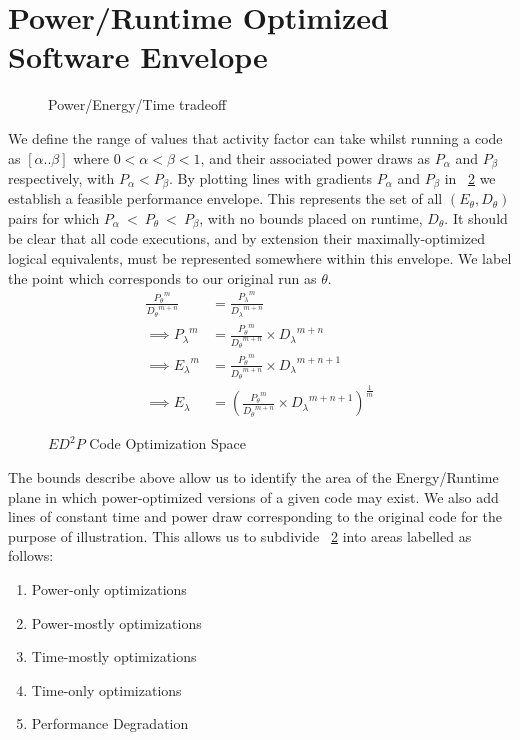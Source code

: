 
\section{Power/Runtime Optimized Software Envelope}

\begin{figure}
\centering

\caption{Power/Energy/Time tradeoff}
\label{fig:motivation}
\end{figure}


We define the range of values that activity factor can take whilst running a code as $[\alpha  .. \beta]$ where $0 < \alpha < \beta < 1$, and their associated power draws as $P_{\alpha}$ and $P_{\beta}$ respectively, with $P_{\alpha} < P_{\beta}$. By plotting lines with gradients $P_{\alpha}$ and $P_{\beta}$ in \figurename~\ref{fig:modeldraw} we establish a feasible performance envelope. This represents the set of all $(E_\theta, D_\theta)$ pairs for which $P_{\alpha}~<~P_\theta~<~P_{\beta}$, with no bounds placed on runtime, $D_\theta$. It should be clear that all code executions, and by extension their maximally-optimized logical equivalents, must be represented somewhere within this envelope. We label the point which corresponds to our original run as $\theta$.
\begin{align}
\frac{{P_{\theta}}^m}{{D_{\theta}}^{m+n}} &= \frac{{P_{\lambda}}^m}{{D_{\lambda}}^{m+n}} \nonumber \\
\implies {P_{\lambda}}^m &= \frac{{P_{\theta}}^m}{{D_{\theta}}^{m+n}} \times {D_\lambda}^{m+n} \nonumber \\ 
\implies {E_{\lambda}}^m &= \frac{{P_{\theta}}^m}{{D_{\theta}}^{m+n}} \times {D_\lambda}^{m+n+1} \nonumber \\ 
\implies E_{\lambda} &= (\frac{{P_{\theta}}^m}{{D_{\theta}}^{m+n}} \times {D_\lambda}^{m+n+1})^{\frac{1}{m}} 
\end{align}

\begin{figure}
\centering

\caption{$ED^2P$ Code Optimization Space}
\label{fig:modeldraw}
\end{figure}
The bounds describe above allow us to identify the area of the Energy/Runtime plane in which power-optimized versions of a given code may exist. We also add lines of constant time and power draw corresponding to the original code for the purpose of illustration. This allows us to subdivide \figurename~\ref{fig:modeldraw} into areas labelled as follows:
\begin{enumerate}
\item Power-only optimizations
\item Power-mostly optimizations
\item Time-mostly optimizations
\item Time-only optimizations
\item Performance Degradation
\end{enumerate}
